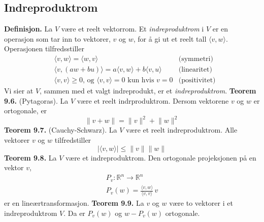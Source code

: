 \documentclass{article}
\begin{document}
\subsection{Indreproduktrom}
\textbf{Definisjon.} La $V$ være et reelt vektorrom. Et \textit{indreproduktrom} i $V$ er en operasjon som tar inn to vektorer, $v$ og $w$, for å gi ut et reelt tall $\langle v, w \rangle$. Operasjonen tilfredsstiller
\begin{align*}
    &\langle v, w \rangle = \langle w, v \rangle &\text{(symmetri)} \\
    &\langle v, (aw + bu) \rangle = a \langle v, w \rangle + b \langle v, u \rangle &\text{(linearitet)} \\
    &\langle v, v \rangle \geq 0 \text{, og } \langle v, v \rangle = 0 \text{ kun hvis } v = 0 &\text{(positivitet)}
\end{align*}
Vi sier at $V$, sammen med et valgt indreprodukt, er et \textit{indreproduktrom}.
\textbf{Teorem 9.6.} (Pytagoras). La $V$ være et reelt indrproduktrom. Dersom vektorene $v$ og $w$ er ortogonale, er
\[ \lVert v + w \rVert = \lVert v \rVert^2 + \lVert w \rVert^2 \]
\textbf{Teorem 9.7.} (Cauchy-Schwarz). La $V$ være et reelt indreproduktrom. Alle vektorer $v$ og $w$ tilfredstiller
\[| \langle v, w \rangle | \leq \lVert v \rVert \lVert w \rVert \]
\textbf{Teorem 9.8.} La $V$ være et indreproduktrom. Den ortogonale projeksjonen på en vektor $v$,
\begin{gather*}
    P_v : \mathbb{R}^n \rightarrow \mathbb{R}^n \\
    P_v(w)=\frac{\langle v, w \rangle}{\langle v, v \rangle}\,v
\end{gather*}
er en lineærtransformasjon.
\textbf{Teorem 9.9.} La $v$ og $w$ være to vektorer i et indreproduktrom $V$. Da er $P_v(w)$ og $w-P_v(w)$ ortogonale.
\end{document}
